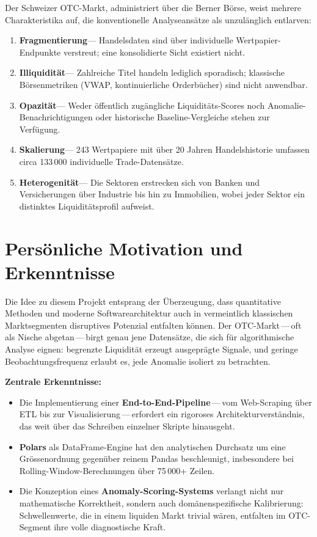 \documentclass[12pt, a4paper, oneside]{report}
\begin{document}
Der Schweizer OTC-Markt, administriert \"uber die Berner B\"orse, weist mehrere Charakteristika auf, die konventionelle Analyseans\"atze als unzul\"anglich entlarven:

\begin{enumerate}[label=\textcolor{swissred}{\textbf{\arabic*.}}]
  \item \textbf{Fragmentierung}\;--- Handelsdaten sind \"uber individuelle Wertpapier-Endpunkte verstreut; eine konsolidierte Sicht existiert nicht.
  \item \textbf{Illiquidit\"at}\;--- Zahlreiche Titel handeln lediglich sporadisch; klassische B\"orsenmetriken (VWAP, kontinuierliche Orderb\"ucher) sind nicht anwendbar.
  \item \textbf{Opazit\"at}\;--- Weder \"offentlich zug\"angliche Liquidit\"ats-Scores noch Anomalie-Benachrichtigungen oder historische Baseline-Vergleiche stehen zur Verf\"ugung.
  \item \textbf{Skalierung}\;--- 243 Wertpapiere mit \"uber 20 Jahren Handelshistorie umfassen circa 133\,000 individuelle Trade-Datens\"atze.
  \item \textbf{Heterogenit\"at}\;--- Die Sektoren erstrecken sich von Banken und Versicherungen \"uber Industrie bis hin zu Immobilien, wobei jeder Sektor ein distinktes Liquidit\"atsprofil aufweist.
\end{enumerate}

\section{Pers\"onliche Motivation und Erkenntnisse}

Die Idee zu diesem Projekt entsprang der \"Uberzeugung, dass quantitative Methoden und moderne Softwarearchitektur auch in vermeintlich \glqq klassischen\grqq{} Marktsegmenten disruptives Potenzial entfalten k\"onnen. Der OTC-Markt\,---\,oft als Nische abgetan\,---\,birgt genau jene Datens\"atze, die sich f\"ur algorithmische Analyse eignen: begrenzte Liquidit\"at erzeugt ausgepr\"agte Signale, und geringe Beobachtungsfrequenz erlaubt es, jede Anomalie isoliert zu betrachten.

\textbf{Zentrale Erkenntnisse:}
\begin{itemize}
  \item Die Implementierung einer \textbf{End-to-End-Pipeline}\,---\,vom Web-Scraping \"uber ETL bis zur Visualisierung\,---\,erfordert ein rigoroses Architekturverst\"andnis, das weit \"uber das Schreiben einzelner Skripte hinausgeht.
  \item \textbf{Polars} als DataFrame-Engine hat den analytischen Durchsatz um eine Gr\"ossenordnung gegen\"uber reinem Pandas beschleunigt, insbesondere bei Rolling-Window-Berechnungen \"uber 75\,000+ Zeilen.
  \item Die Konzeption eines \textbf{Anomaly-Scoring-Systems} verlangt nicht nur mathematische Korrektheit, sondern auch dom\"anenspezifische Kalibrierung: Schwellenwerte, die in einem liquiden Markt trivial w\"aren, entfalten im OTC-Segment ihre volle diagnostische Kraft.
\end{itemize}
\end{document}
